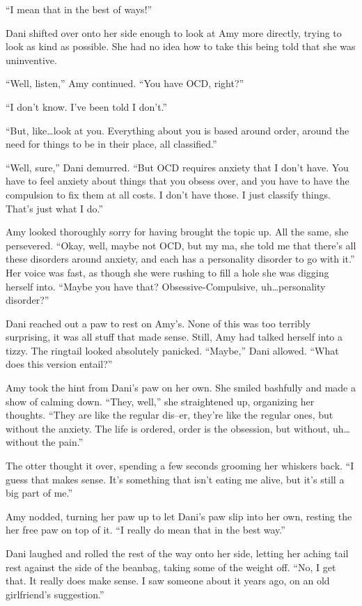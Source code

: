 ``I mean that in the best of ways!''

Dani shifted over onto her side enough to look at Amy more directly, trying to look as kind as possible. She had no idea how to take this being told that she was uninventive.

``Well, listen,'' Amy continued. ``You have OCD, right?''

``I don't know. I've been told I don't.''

``But, like\ldots{}look at you. Everything about you is based around order, around the need for things to be in their place, all classified.''

``Well, sure,'' Dani demurred. ``But OCD requires anxiety that I don't have. You have to feel anxiety about things that you obsess over, and you have to have the compulsion to fix them at all costs. I don't have those. I just classify things. That's just what I do.''

Amy looked thoroughly sorry for having brought the topic up. All the same, she persevered. ``Okay, well, maybe not OCD, but my ma, she told me that there's all these disorders around anxiety, and each has a personality disorder to go with it.'' Her voice was fast, as though she were rushing to fill a hole she was digging herself into. ``Maybe you have that? Obsessive-Compulsive, uh\ldots{}personality disorder?''

Dani reached out a paw to rest on Amy's. None of this was too terribly surprising, it was all stuff that made sense. Still, Amy had talked herself into a tizzy. The ringtail looked absolutely panicked. ``Maybe,'' Dani allowed. ``What does this version entail?''

Amy took the hint from Dani's paw on her own. She smiled bashfully and made a show of calming down. ``They, well,'' she straightened up, organizing her thoughts. ``They are like the regular dis--er, they're like the regular ones, but without the anxiety. The life is ordered, order is the obsession, but without, uh\ldots{}without the pain.''

The otter thought it over, spending a few seconds grooming her whiskers back. ``I guess that makes sense. It's something that isn't eating me alive, but it's still a big part of me.''

Amy nodded, turning her paw up to let Dani's paw slip into her own, resting the her free paw on top of it. ``I really do mean that in the best way.''

Dani laughed and rolled the rest of the way onto her side, letting her aching tail rest against the side of the beanbag, taking some of the weight off. ``No, I get that. It really does make sense. I saw someone about it years ago, on an old girlfriend's suggestion.''

